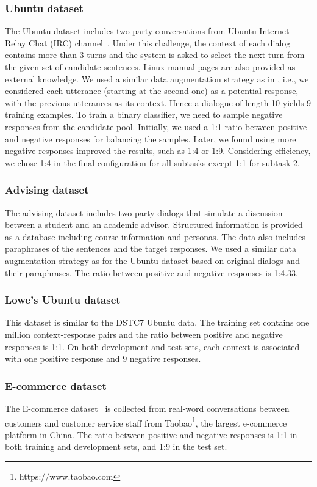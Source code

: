 \documentclass[letterpaper]{article} \usepackage{aaai19}  \usepackage{times}  \usepackage{helvet}  \usepackage{courier}  \usepackage{url}  \usepackage{graphicx}
\begin{document}
\subsubsection{Ubuntu dataset}
The Ubuntu dataset includes two party conversations from Ubuntu Internet Relay Chat (IRC) channel~\cite{kummerfeld2018analyzing}. Under this challenge, the context of each dialog contains more than 3 turns and the system is asked to select the next turn from the given set of candidate sentences. Linux manual pages are also provided as external knowledge. We used a similar data augmentation strategy as in \cite{DBLP:conf/sigdial/LowePSP15}, i.e., we considered each utterance (starting at the second one) as a potential response, with the previous utterances as its context. Hence a dialogue of length 10 yields 9 training examples. To train a binary classifier, we need to sample negative responses from the candidate pool. Initially, we used a 1:1 ratio between positive and negative responses for balancing the samples. Later, we found using more negative responses improved the results, such as 1:4 or 1:9. Considering efficiency, we chose 1:4 in the final configuration for all subtasks except 1:1 for subtask 2.

\subsubsection{Advising dataset}
The advising dataset includes two-party dialogs that simulate a discussion between a student and an academic advisor. Structured information is provided as a database including course information and personas. The data also includes paraphrases of the sentences and the target responses. We used a similar data augmentation strategy as for the Ubuntu dataset based on original dialogs and their paraphrases. The ratio between positive and negative responses is 1:4.33.

\subsubsection{Lowe's Ubuntu dataset}
This dataset is similar to the DSTC7 Ubuntu data. The training set contains one million context-response pairs and the ratio between positive and negative responses is 1:1. On both development and test sets, each context is associated with one positive response and 9 negative responses. 

\subsubsection{E-commerce dataset}
The E-commerce dataset~\cite{DBLP:conf/coling/ZhangLZZL18} is collected from real-word conversations between customers and customer service staff from Taobao\footnote{https://www.taobao.com}, the largest e-commerce platform in China. The ratio between positive and negative responses is 1:1 in both training and development sets, and 1:9 in the test set. 
\end{document}
